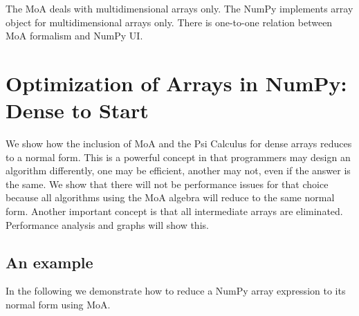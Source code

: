 \documentclass[a4paper,12pt]{article}
\begin{document}
The MoA deals with multidimensional arrays only.  The NumPy implements
array object for multidimensional arrays only. There is one-to-one
relation between MoA formalism and NumPy UI. %



\section{Optimization of Arrays in NumPy: Dense to Start}
We show how the inclusion of MoA and the Psi Calculus for dense arrays
reduces to a normal form. This is a powerful concept in that programmers may design an algorithm differently, one may be efficient, another may not, even if the answer is the same. 
\noindent
We show that there will not be performance issues for that choice because all algorithms using the MoA algebra will reduce to the same normal form. Another important concept is that all intermediate arrays are eliminated. Performance analysis and graphs will show this.

\subsection{An example}

In the following we demonstrate how to reduce a NumPy array expression
to its normal form using MoA.
\end{document}
